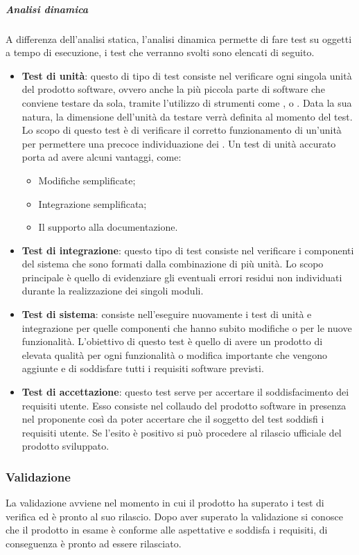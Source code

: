 \documentclass[../PianoDiQualifica.tex]{subfiles}
\begin{document}
				\subparagraph{Analisi dinamica}
				A differenza dell'analisi statica, l'analisi dinamica permette di fare test su oggetti a tempo di esecuzione, i test che verranno svolti sono elencati di seguito.
				\begin{itemize}
					\item \textbf{Test di unità}: questo di tipo di test consiste nel verificare ogni singola unità del prodotto software, ovvero anche la più piccola parte di software che conviene testare da sola, tramite l'utilizzo di strumenti come ,  o . Data la sua natura, la dimensione dell'unità da testare verrà definita al momento del test. Lo scopo di questo test è di verificare il corretto funzionamento di un'unità per permettere una precoce individuazione dei . Un test di unità accurato porta ad avere alcuni vantaggi, come:
					\begin{itemize}
						\item Modifiche semplificate;
						\item Integrazione semplificata;
						\item Il supporto alla documentazione.
					\end{itemize}

					\item \textbf{Test di integrazione}: questo tipo di test consiste nel verificare i componenti del sistema che sono formati dalla combinazione di più unità. Lo scopo principale è quello di evidenziare gli eventuali errori residui non individuati durante la realizzazione dei singoli moduli.
					\item \textbf{Test di sistema}: consiste nell'eseguire nuovamente i test di unità e integrazione per quelle componenti che hanno subito modifiche o per le nuove funzionalità. L'obiettivo di questo test è quello di avere un prodotto di elevata qualità per ogni funzionalità o modifica importante che vengono aggiunte e di soddisfare tutti i requisiti software previsti.
					\item \textbf{Test di accettazione}: questo test serve per accertare il soddisfacimento dei requisiti utente. Esso consiste nel collaudo del prodotto software in presenza nel proponente così da poter accertare che il soggetto del test soddisfi i requisiti utente. Se l'esito è positivo si può procedere al rilascio ufficiale del prodotto sviluppato.
				\end{itemize}

			\subsubsection{Validazione}
				La validazione avviene nel momento in cui il prodotto ha superato i test di verifica ed è pronto al suo rilascio. Dopo aver superato la validazione si conosce che il prodotto in esame è conforme alle aspettative e soddisfa i requisiti, di conseguenza è pronto ad essere rilasciato.
\end{document}
